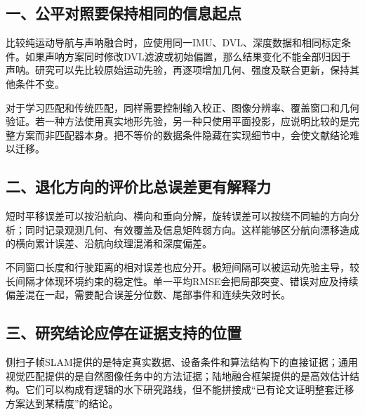 \hypertarget{ux4e00ux516cux5e73ux5bf9ux7167ux8981ux4fddux6301ux76f8ux540cux7684ux4fe1ux606fux8d77ux70b9}{%
\subsection{一、公平对照要保持相同的信息起点}\label{ux4e00ux516cux5e73ux5bf9ux7167ux8981ux4fddux6301ux76f8ux540cux7684ux4fe1ux606fux8d77ux70b9}}

比较纯运动导航与声呐融合时，应使用同一IMU、DVL、深度数据和相同标定条件。如果声呐方案同时修改DVL滤波或初始偏置，那么结果变化不能全部归因于声呐。研究可以先比较原始运动先验，再逐项增加几何、强度及联合更新，保持其他条件不变。

对于学习匹配和传统匹配，同样需要控制输入校正、图像分辨率、覆盖窗口和几何验证。若一种方法使用真实地形先验，另一种只使用平面投影，应说明比较的是完整方案而非匹配器本身。把不等价的数据条件隐藏在实现细节中，会使文献结论难以迁移。

\hypertarget{ux4e8cux9000ux5316ux65b9ux5411ux7684ux8bc4ux4ef7ux6bd4ux603bux8befux5deeux66f4ux6709ux89e3ux91caux529b}{%
\subsection{二、退化方向的评价比总误差更有解释力}\label{ux4e8cux9000ux5316ux65b9ux5411ux7684ux8bc4ux4ef7ux6bd4ux603bux8befux5deeux66f4ux6709ux89e3ux91caux529b}}

短时平移误差可以按沿航向、横向和垂向分解，旋转误差可以按绕不同轴的方向分析；同时记录观测几何、有效覆盖及信息矩阵弱方向。这样能够区分航向漂移造成的横向累计误差、沿航向纹理混淆和深度偏差。

不同窗口长度和行驶距离的相对误差也应分开。极短间隔可以被运动先验主导，较长间隔才体现环境约束的稳定性。单一平均RMSE会把局部突变、错误对应及持续偏差混在一起，需要配合误差分位数、尾部事件和连续失效时长。

\hypertarget{ux4e09ux7814ux7a76ux7ed3ux8bbaux5e94ux505cux5728ux8bc1ux636eux652fux6301ux7684ux4f4dux7f6e}{%
\subsection{三、研究结论应停在证据支持的位置}\label{ux4e09ux7814ux7a76ux7ed3ux8bbaux5e94ux505cux5728ux8bc1ux636eux652fux6301ux7684ux4f4dux7f6e}}

侧扫子帧SLAM提供的是特定真实数据、设备条件和算法结构下的直接证据；通用视觉匹配提供的是自然图像任务中的方法证据；陆地融合框架提供的是高效估计结构。它们可以构成有逻辑的水下研究路线，但不能拼接成``已有论文证明整套迁移方案达到某精度''的结论。

